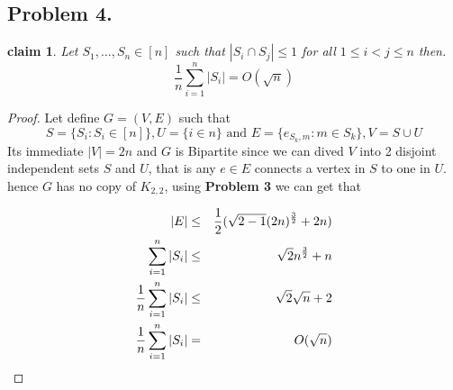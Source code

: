 \documentclass[12pt]{article}
\newtheorem*{claim*}{claim}
\begin{document}
\subsection*{Problem 4.}
\begin{claim*}
Let $S_1, \dots , S_n \in [n]$  such that $|S_i  \cap S_j | \le 1$ for all $1 \le i < j \le n$ then.
\[\frac{1}{n}\sum^n_{i=1}|S_i|=O(\sqrt{n})
\]
\end{claim*}
\begin{proof} Let define $G=(V,E)$ such that \[S=\{S_i:S_i\in [n]\},U=\{i\in n\}\text{ and }  E=\{e_{S_k,m}:m\in S_k \},   V =S\cup U  \]
Its immediate $|V|=2n$ and $G$ is Bipartite since we can dived $V$ into 2 disjoint  independent sets $S$ and $U$, that is  any $e\in E$ connects a vertex in $S$ to one in $U$. hence $G$ has no copy of $K_{2,2}$, using \textbf{Problem 3} we can get that 
\item \begin{eqnarray}
|E|&\le& {1\over 2}(\sqrt{2-1}(2n)^{3\over 2}+2n)\\
\sum^n_{i=1}|S_i|&\le& \sqrt{2}n^{3\over 2}+n\\
{1\over n} \sum^n_{i=1}|S_i|&\le& \sqrt{2}\sqrt{n}+2\\
\frac{1}{n}\sum^n_{i=1}|S_i|&=&O(\sqrt{n})
\end{eqnarray}
\end{proof}
\pagebreak
\end{document}
